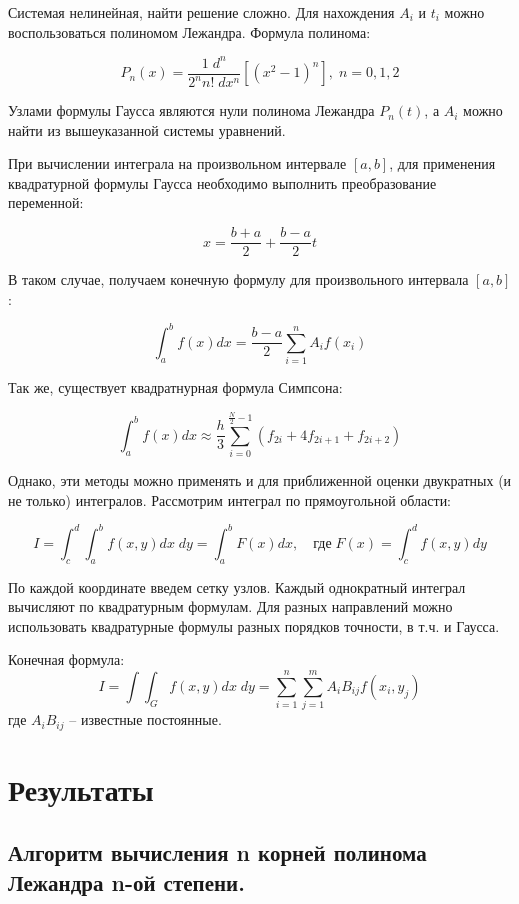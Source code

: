 \documentclass[a4paper,12pt]{article}
\begin{document}
\noindent Системая нелинейная, найти решение сложно. Для нахождения $A_{i}$ и $t_{i}$ можно воспользоваться полиномом Лежандра. Формула полинома:

$$ P_{n}(x) = \frac{1\;d^n}{2^nn!\;dx^n} [(x^2 - 1)^n], \; n = 0, 1, 2$$

\noindent Узлами формулы Гаусса являются нули полинома Лежандра $P_{n}(t)$, а $A_{i}$ можно найти из вышеуказанной системы уравнений.\newline

\noindent При вычислении интеграла на произвольном интервале $[a, b]$, для применения квадратурной формулы Гаусса необходимо выполнить преобразование переменной:

$$ x = \frac{b + a}{2} + \frac{b - a}{2}t$$

\noindent В таком случае, получаем конечную формулу для произвольного интервала $[a, b]$:

$$ \int_{a}^{b}f(x)dx = \frac{b - a}{2}\sum_{i = 1}^{n} A_{i}f(x_{i})$$

\noindent Так же, существует квадратнурная формула Симпсона:

$$ \int_{a}^{b} f(x)dx \approx \frac{h}{3} \sum_{i = 0}^{\frac{N}{2} - 1} (f_{2i} + 4f_{2i + 1} + f_{2i + 2})$$

\noindent Однако, эти методы можно применять и для приближенной оценки двукратных (и не только) интегралов. Рассмотрим интеграл по прямоугольной области:

$$ I = \int_{c}^{d} \int_{a}^{b} f(x, y)dx\;dy =\int_{a}^{b}F(x)dx, \quad \text{где} \; F(x) = \int_{c}^{d}f(x, y)dy$$\newline


\noindent По каждой координате введем сетку узлов. Каждый однократный интеграл вычисляют по квадратурным формулам. Для разных направлений можно использовать квадратурные формулы разных порядков точности, в т.ч. и Гаусса.\newline

\noindent Конечная формула: 
$$ I = \int\int_{G}f(x, y)dx\;dy = \sum_{i = 1}^{n} \sum_{j = 1}^{m}A_{i}B_{ij}f(x_{i}, y_{j})$$
\noindent \large{где $A_{i}B_{ij}$ -- известные постоянные.}
\clearpage %

\section{Результаты}
\subsection{Алгоритм вычисления n корней полинома Лежандра n-ой степени.}
\end{document}

